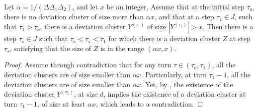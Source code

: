 \begin{corollary}
  \label{claim:inter}
  Let $\alpha = 1 / (\Delta\Delta_{1}\Delta_{2})$, and let $x$ be an integer. Assume that at the initial step $\tau_{o}$, there is no deviation cluster of size more than $\alpha x$, and that at a step $\tau_{1} \in J$, such that $\tau_{1} > \tau_{o}$, there is a deviation cluster $Y^{(\tau_{1})}$ of size $|Y^{(\tau_{1})}| > x$. Then there is a step $\tau_{\star} \in J$ such that $\tau_{o} < \tau_{\star} < \tau_{1}$ for which there is a deviation cluster $Z$ at step $\tau_{\star}$, satisfying that the size of $Z$ is in the range $(\alpha x, x)$.
\end{corollary}
\begin{proof}
Assume through contradiction that for any turn $\tau \in (\tau_{o}, \tau_{1})$, all the deviation clusters are of size smaller than $\alpha x$. Particularly, at turn $\tau_{1}-1$, all the deviation clusters are of size smaller than $\alpha x$. Yet, by , the existence of the deviation cluster $Y^{(\tau_{1})}$, at size $d$, implies the existence of a deviation cluster at turn $\tau_{1} - 1$, of size at least $\alpha x$, which leads to a contradiction.
\end{proof}

